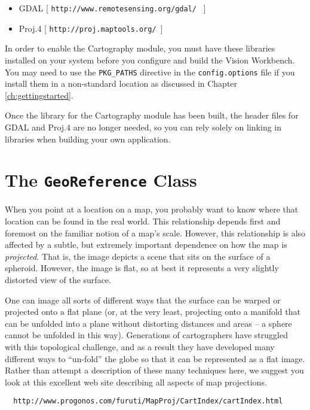 \begin{itemize}
\item GDAL   [ {\tt http://www.remotesensing.org/gdal/ } ]
\item Proj.4 [ {\tt http://proj.maptools.org/ }]
\end{itemize}

In order to enable the Cartography module, you must have these
libraries installed on your system before you configure and build the
Vision Workbench.  You may need to use the \verb#PKG_PATHS# directive
in the \verb#config.options# file if you install them in a
non-standard location as discussed in Chapter \ref{ch:gettingstarted}.

Once the library for the Cartography module has been built, the header
files for GDAL and Proj.4 are no longer needed, so you can rely solely
on linking in libraries when building your own application.

\section{The {\tt GeoReference} Class}

When you point at a location on a map, you probably want to know where
that location can be found in the real world.  This relationship
depends first and foremost on the familiar notion of a map's scale.
However, this relationship is also affected by a subtle, but extremely
important dependence on how the map is {\em projected}.  That is, the
image depicts a scene that sits on the surface of a spheroid.
However, the image is flat, so at best it represents a very slightly
distorted view of the surface.  

One can image all sorts of different ways that the surface can be
warped or projected onto a flat plane (or, at the very least,
projecting onto a manifold that can be unfolded into a plane without
distorting distances and areas -- a sphere cannot be unfolded in this
way).  Generations of cartographers have struggled with this
topological challenge, and as a result they have developed many
different ways to ``un-fold'' the globe so that it can be represented
as a flat image.  Rather than attempt a description of these many
techniques here, we suggest you look at this excellent web site
describing all aspects of map projections.

\begin{verbatim}
  http://www.progonos.com/furuti/MapProj/CartIndex/cartIndex.html
\end{verbatim}

